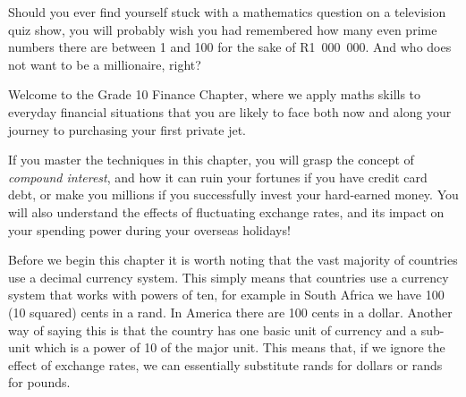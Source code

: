       
      \label{m39332*id66349}Should you ever find yourself stuck with a mathematics question on a television quiz show, you will probably wish you had remembered how many even prime numbers there are between 1 and 100 for the sake of R1~000~000. And who does not want to be a millionaire, right?\par 
      \label{m39332*id66356}Welcome to the Grade 10 Finance Chapter, where we apply maths skills to everyday financial situations that you are likely to face both now and along your journey to purchasing your first private jet.\par 
      \label{m39332*id66361}If you master the techniques in this chapter, you will grasp the concept of \textsl{compound interest}, and how it can ruin your fortunes if you have credit card debt, or make you millions if you successfully invest your hard-earned money. You will also understand the effects of fluctuating exchange rates, and its impact on your spending power during your overseas holidays!\par \label{m39332*eip-810}Before we begin this chapter it is worth noting that the vast majority of countries use a decimal currency system. This simply means that countries use a currency system that works with powers of ten, for example in South Africa we have 100 (10 squared) cents in a rand. In America there are 100 cents in a dollar. Another way of saying this is that the country has one basic unit of currency and a sub-unit which is a power of 10 of the major unit. This means that, if we ignore the effect of exchange rates, we can essentially substitute rands for dollars or rands for pounds.\par 
    
  
 
